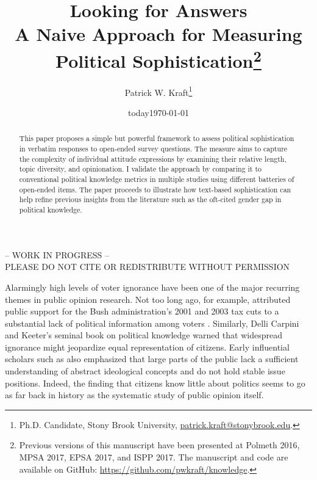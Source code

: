 \documentclass[12pt]{article}
\author{Patrick W. Kraft\footnote{Ph.D. Candidate, Stony Brook University, \href{mailto:patrick.kraft@stonybrook.edu}{patrick.kraft@stonybrook.edu}.
}}
\date{today}
\title{Looking for Answers\\
\large{A Naive Approach for Measuring Political Sophistication}\footnote{Previous versions of this manuscript have been presented at Polmeth 2016, MPSA 2017, EPSA 2017, and ISPP 2017.
The manuscript and code are available on GitHub: \url{https://github.com/pwkraft/knowledge}.
}
}
\date{\today}
\begin{document}
\maketitle
\onehalfspacing
\thispagestyle{empty}

\begin{center}
-- WORK IN PROGRESS -- \\
PLEASE DO NOT CITE OR REDISTRIBUTE WITHOUT PERMISSION
\end{center} 

\hfill
\begin{abstract}\singlespacing
This paper proposes a simple but powerful framework to assess political sophistication in verbatim responses to open-ended survey questions. The measure aims to capture the complexity of individual attitude expressions by examining their relative length, topic diversity, and opinionation. I validate the approach by comparing it to conventional political knowledge metrics in multiple studies using different batteries of open-ended items. The paper proceeds to illustrate how text-based sophistication can help refine previous insights from the literature such as the oft-cited gender gap in political knowledge.


\end{abstract}
\hfill
\newpage\setcounter{page}{1}



Alarmingly high levels of voter ignorance have been one of the major recurring themes in public opinion research. Not too long ago, for example, \citet{bartels2005homer} attributed public support for the Bush administration's 2001 and 2003 tax cuts to a substantial lack of political information among voters \citep[but see][]{lupia2007were,bartels2007homer}. Similarly, Delli Carpini and Keeter's \citeyearpar{carpini1996americans} seminal book on political knowledge warned that widespread ignorance might jeopardize equal representation of citizens. Early influential scholars such as \citet{converse1964nature} also emphasized that large parts of the public lack a sufficient understanding of abstract ideological concepts and do not hold stable issue positions. Indeed, the finding that citizens know little about politics seems to go as far back in history as the systematic study of public opinion itself.
\end{document}
